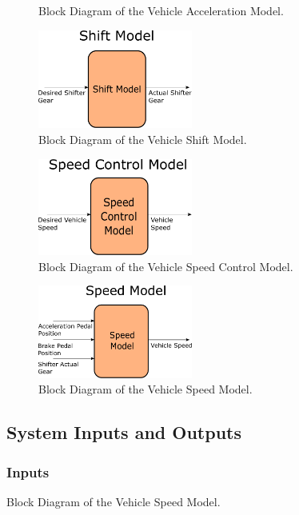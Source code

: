 \documentclass[12pt]{article} %
\begin{document}
\begin{figure}
\begin{figure}
    \caption{Block Diagram of the Vehicle Acceleration Model.}
    \label{fig:accelBlockDiag}
\end{figure}
%
\begin{figure}
    \centering
    \captionsetup{justification=centering, margin=3cm}
    \includegraphics[width=2in]{figs/inkscape/shiftModelArchitecture}
    \caption{Block Diagram of the Vehicle Shift Model.}
    \label{fig:shiftBlockDiag}
\end{figure}
%
\begin{figure}
    \centering
    \captionsetup{justification=centering, margin=3cm}
    \includegraphics[width=2in]{figs/inkscape/speedControlModelArchitecture}
    \caption{Block Diagram of the Vehicle Speed Control Model.}
    \label{fig:cruiseBlockDiag}
\end{figure}
%
\begin{figure}
    \centering
    \captionsetup{justification=centering, margin=3cm}
    \includegraphics[width=2in]{figs/inkscape/speedModelArchitecture}
    \caption{Block Diagram of the Vehicle Speed Model.}
    \label{fig:speedBlockDiag}
\end{figure}
%

\subsection{System Inputs and Outputs}
\subsubsection{Inputs}


\end{figure}
\end{document}
